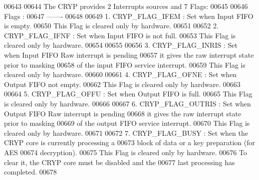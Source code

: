 \begin{DoxyCode}
00643 \textcolor{comment}{}
00644 \textcolor{comment}{  The CRYP provides 2 Interrupts sources and 7 Flags:}
00645 \textcolor{comment}{}
00646 \textcolor{comment}{  Flags :}
00647 \textcolor{comment}{  ------- }
00648 \textcolor{comment}{                          }
00649 \textcolor{comment}{     1. CRYP\_FLAG\_IFEM :  Set when Input FIFO is empty.}
00650 \textcolor{comment}{                          This Flag is cleared only by hardware.}
00651 \textcolor{comment}{      }
00652 \textcolor{comment}{     2. CRYP\_FLAG\_IFNF :  Set when Input FIFO is not full.}
00653 \textcolor{comment}{                          This Flag is cleared only by hardware.}
00654 \textcolor{comment}{}
00655 \textcolor{comment}{}
00656 \textcolor{comment}{     3. CRYP\_FLAG\_INRIS  : Set when Input FIFO Raw interrupt is pending }
00657 \textcolor{comment}{                           it gives the raw interrupt state prior to masking }
00658 \textcolor{comment}{                           of the input FIFO service interrupt.}
00659 \textcolor{comment}{                           This Flag is cleared only by hardware.}
00660 \textcolor{comment}{     }
00661 \textcolor{comment}{     4. CRYP\_FLAG\_OFNE   : Set when Output FIFO not empty.}
00662 \textcolor{comment}{                           This Flag is cleared only by hardware.}
00663 \textcolor{comment}{        }
00664 \textcolor{comment}{     5. CRYP\_FLAG\_OFFU   : Set when Output FIFO is full.}
00665 \textcolor{comment}{                           This Flag is cleared only by hardware.}
00666 \textcolor{comment}{                           }
00667 \textcolor{comment}{     6. CRYP\_FLAG\_OUTRIS : Set when Output FIFO Raw interrupt is pending }
00668 \textcolor{comment}{                           it gives the raw interrupt state prior to masking }
00669 \textcolor{comment}{                           of the output FIFO service interrupt.}
00670 \textcolor{comment}{                           This Flag is cleared only by hardware.}
00671 \textcolor{comment}{                               }
00672 \textcolor{comment}{     7. CRYP\_FLAG\_BUSY   : Set when the CRYP core is currently processing a }
00673 \textcolor{comment}{                           block of data or a key preparation (for AES }
00674 \textcolor{comment}{                           decryption).}
00675 \textcolor{comment}{                           This Flag is cleared only by hardware.}
00676 \textcolor{comment}{                           To clear it, the CRYP core must be disabled and the }
00677 \textcolor{comment}{                           last processing has completed. }
00678 \textcolor{comment}{}

\end{DoxyCode}
